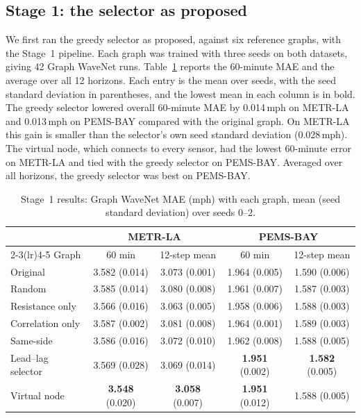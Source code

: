\documentclass[journal]{IEEEtran}
\newcommand{\best}[1]{\textbf{#1}}
\newcommand{\ms}{\,mph}
\begin{document}
\subsection{Stage 1: the selector as proposed}\label{sec:stage1}

We first ran the greedy selector as proposed, against six reference graphs, with the Stage~1 pipeline. Each graph was trained with three seeds on both datasets, giving 42 Graph WaveNet runs. Table~\ref{tab:stage1} reports the 60-minute MAE and the average over all 12 horizons. Each entry is the mean over seeds, with the seed standard deviation in parentheses, and the lowest mean in each column is in bold. The greedy selector lowered overall 60-minute MAE by 0.014\ms{} on METR-LA and 0.013\ms{} on PEMS-BAY compared with the original graph. On METR-LA this gain is smaller than the selector's own seed standard deviation (0.028\ms{}). The virtual node, which connects to every sensor, had the lowest 60-minute error on METR-LA and tied with the greedy selector on PEMS-BAY. Averaged over all horizons, the greedy selector was best on PEMS-BAY.

\begin{table}[!t]
\centering
\caption{Stage~1 results: Graph WaveNet MAE (mph) with each graph, mean (seed standard deviation) over seeds 0--2.}
\label{tab:stage1}
\footnotesize
\setlength{\tabcolsep}{2pt}
\begin{tabular}{@{}lcccc@{}}
\toprule
& \multicolumn{2}{c}{METR-LA} & \multicolumn{2}{c}{PEMS-BAY} \\
\cmidrule(lr){2-3}\cmidrule(lr){4-5}
Graph & 60 min & 12-step mean & 60 min & 12-step mean \\
\midrule
Original & 3.582 (0.014) & 3.073 (0.001) & 1.964 (0.005) & 1.590 (0.006) \\
Random & 3.585 (0.014) & 3.080 (0.008) & 1.961 (0.007) & 1.587 (0.003) \\
Resistance only & 3.566 (0.016) & 3.063 (0.005) & 1.958 (0.006) & 1.588 (0.003) \\
Correlation only & 3.587 (0.002) & 3.081 (0.008) & 1.964 (0.001) & 1.589 (0.003) \\
Same-side & 3.586 (0.016) & 3.072 (0.010) & 1.962 (0.008) & 1.588 (0.005) \\
Lead--lag selector & 3.569 (0.028) & 3.069 (0.014) & \best{1.951} (0.002) & \best{1.582} (0.005) \\
Virtual node & \best{3.548} (0.020) & \best{3.058} (0.007) & \best{1.951} (0.012) & 1.588 (0.005) \\
\bottomrule
\end{tabular}
\end{table}
\end{document}
